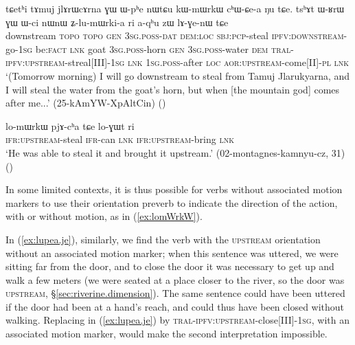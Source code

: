 \begin{exe}
\ex \label{ex:ZlumWrkia}
 \gll tɕetʰi tɤmuj jlɤrɯcɤrna ɣɯ ɯ-pʰe nɯtɕu kɯ-mɯrkɯ cʰɯ-ɕe-a ŋu tɕe. tsʰɤt ɯ-ʁrɯ ɣɯ ɯ-ci nɯnɯ ʑ-lu-mɯrki-a ri a-qʰu zɯ lɤ-ɣe-nɯ tɕe \\
 downstream  \textsc{topo} \textsc{topo} \textsc{gen} \textsc{3sg}.\textsc{poss}-\textsc{dat} \textsc{dem}:\textsc{loc}  \textsc{sbj}:\textsc{pcp}-steal  \textsc{ipfv}:\textsc{downstream}-go-\textsc{1sg} be:\textsc{fact} \textsc{lnk}  goat \textsc{3sg}.\textsc{poss}-horn \textsc{gen} \textsc{3sg}.\textsc{poss}-water \textsc{dem} \textsc{tral}-\textsc{ipfv}:\textsc{upstream}-streal[III]-\textsc{1sg} \textsc{lnk} \textsc{1sg}.\textsc{poss}-after \textsc{loc} \textsc{aor}:\textsc{upstream}-come[II]-\textsc{pl} \textsc{lnk}  \\
 \glt `(Tomorrow  morning) I will go downstream to steal from Tamuj Jlarukyarna, and I will steal the water from the goat's horn, but when [the mountain god] comes after me...' (25-kAmYW-XpAltCin)
()
\end{exe}

\begin{exe}
\ex \label{ex:lomWrkW}
 \gll lo-mɯrkɯ pjɤ-cʰa tɕe lo-ɣɯt ri \\
 \textsc{ifr}:\textsc{upstream}-steal \textsc{ifr}-can \textsc{lnk} \textsc{ifr}:\textsc{upstream}-bring \textsc{lnk} \\
\glt `He was able to steal it and brought it upstream.' (02-montagnes-kamnyu-cz, 31)
()
\end{exe}

In some limited contexts, it is thus possible for verbs without associated motion markers to use their orientation preverb to indicate the direction of the action, with or without motion, as in (\ref{ex:lomWrkW}). 

In (\ref{ex:lupea.je}), similarly, we find the verb  with the \textsc{upstream} orientation without an associated motion marker; when this sentence was uttered, we were sitting far from the door, and to close the door it was necessary to get up and walk a few meters (we were seated at a place closer to the river, so the door was \textsc{upstream}, §\ref{sec:riverine.dimension}). The same sentence could have been uttered if the door had been at a hand's reach, and could thus have been closed without walking. Replacing  in (\ref{ex:lupea.je}) by  \textsc{tral}-\textsc{ipfv}:\textsc{upstream}-close[III]-\textsc{1sg}, with an associated motion marker, would make the second interpretation impossible.

